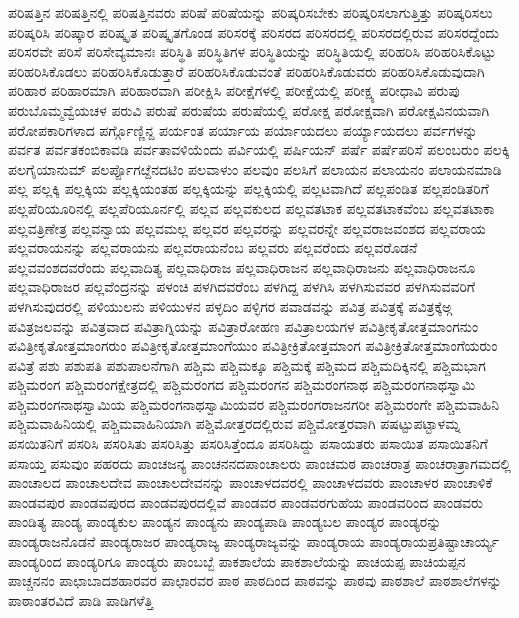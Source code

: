 {ಪರಿಷತ್ತಿನ
ಪರಿಷತ್ತಿನಲ್ಲಿ
ಪರಿಷತ್ತಿನವರು
ಪರಿಷೆ
ಪರಿಷೆಯನ್ನು
ಪರಿಷ್ಕರಿಸಬೇಕು
ಪರಿಷ್ಕರಿಸಲಾಗುತ್ತಿತ್ತು
ಪರಿಷ್ಕರಿಸಲು
ಪರಿಷ್ಕರಿಸಿ
ಪರಿಷ್ಕಾರ
ಪರಿಷ್ಕೃತ
ಪರಿಷ್ಕೃತಗೊಂಡ
ಪರಿಸರಕ್ಕೆ
ಪರಿಸರದ
ಪರಿಸರದಲ್ಲಿ
ಪರಿಸರದಲ್ಲಿರುವ
ಪರಿಸರದ್ದೆಂದು
ಪರಿಸರವೇ
ಪರಿಸೆ
ಪರಿಸೇವ್ಯಮಾನಃ
ಪರಿಸ್ಥಿತಿ
ಪರಿಸ್ಥಿತಿಗಳ
ಪರಿಸ್ಥಿತಿಯನ್ನು
ಪರಿಸ್ಥಿತಿಯಲ್ಲಿ
ಪರಿಹರಿಸಿ
ಪರಿಹರಿಸಿಕೊಟ್ಟು
ಪರಿಹರಿಸಿಕೊಡಲು
ಪರಿಹರಿಸಿಕೊಡುತ್ತಾರೆ
ಪರಿಹರಿಸಿಕೊಡುವಂತೆ
ಪರಿಹರಿಸಿಕೊಡುವರು
ಪರಿಹರಿಸಿಕೊಡುವುದಾಗಿ
ಪರಿಹಾರ
ಪರಿಹಾರಮಾಗಿ
ಪರಿಹಾರವಾಗಿ
ಪರೀಕ್ಷಿಸಿ
ಪರೀಕ್ಷೆಗಳಲ್ಲಿ
ಪರೀಕ್ಷೆಯಲ್ಲಿ
ಪರೀಕ್ಷ್ಯ
ಪರೀಧಾವಿ
ಪರುಪು
ಪರುಬೊಮ್ಮವ್ವೆಯಚಳ
ಪರುವಿ
ಪರುಷೆ
ಪರುಷೆಯ
ಪರುಷೆಯಲ್ಲಿ
ಪರೋಕ್ಷ
ಪರೋಕ್ಷವಾಗಿ
ಪರೋಕ್ಷವಿನಯವಾಗಿ
ಪರೋಪಕಾರಿಗಳಾದ
ಪರ್ಗ್ಗೊಣ್ಣಿನ್ದ
ಪರ್ಯಂತ
ಪರ್ಯಾಯ
ಪರ್ಯಾಯದಲು
ಪರ್ಯ್ಯಾಯದಲು
ಪರ್ವಗಳನ್ನು
ಪರ್ವತ
ಪರ್ವತಕಂಬಿಕಾವಡಿ
ಪರ್ವತಾವಳಿಯೆಂದು
ಪರ್ವಿಯಲ್ಲಿ
ಪರ್ಷಿಯನ್
ಪರ್ಷೆ
ಪರ್ಷೆಪರಿಸೆ
ಪಲಂಬರುಂ
ಪಲಕ್ಕಿ
ಪಲಗೈಯಾನುಮ್
ಪಲರ್ಪ್ಪೊಗೞ್ದೆನದಟಿಂ
ಪಲವಾಳುಂ
ಪಲವುಂ
ಪಲಸಿಗೆ
ಪಲಾಯನ
ಪಲಾಯನಂ
ಪಲಾಯನಮಾಡಿ
ಪಲ್ಲ
ಪಲ್ಲಕ್ಕಿ
ಪಲ್ಲಕ್ಕಿಯ
ಪಲ್ಲಕ್ಕಿಯಂತಹ
ಪಲ್ಲಕ್ಕಿಯನ್ನು
ಪಲ್ಲಕ್ಕಿಯಲ್ಲಿ
ಪಲ್ಲಟವಾಗಿದೆ
ಪಲ್ಲಪಂಡಿತ
ಪಲ್ಲಪಂಡಿತರಿಗೆ
ಪಲ್ಲಪೆರಿಯೂರಿನಲ್ಲಿ
ಪಲ್ಲಪೆರಿಯೂರ್ನಲ್ಲಿ
ಪಲ್ಲವ
ಪಲ್ಲವಕುಲದ
ಪಲ್ಲವತಟಾಕ
ಪಲ್ಲವತಟಾಕವೆಂಬ
ಪಲ್ಲವತಟಾಕಾ
ಪಲ್ಲವತ್ರಿಣೇತ್ರ
ಪಲ್ಲವನ್ವಾಯ
ಪಲ್ಲವಮಲ್ಲ
ಪಲ್ಲವರ
ಪಲ್ಲವರನ್ನು
ಪಲ್ಲವರನ್ನೇ
ಪಲ್ಲವರಾಜವಂಶದ
ಪಲ್ಲವರಾಯ
ಪಲ್ಲವರಾಯನನ್ನು
ಪಲ್ಲವರಾಯನು
ಪಲ್ಲವರಾಯನೆಂಬ
ಪಲ್ಲವರು
ಪಲ್ಲವರೆಂದು
ಪಲ್ಲವರೊಡನೆ
ಪಲ್ಲವವಂಶದವರೆಂದು
ಪಲ್ಲವಾದಿತ್ಯ
ಪಲ್ಲವಾಧಿರಾಜ
ಪಲ್ಲವಾಧಿರಾಜನ
ಪಲ್ಲವಾಧಿರಾಜನು
ಪಲ್ಲವಾಧಿರಾಜನೂ
ಪಲ್ಲವಾಧಿರಾಜರ
ಪಲ್ಲವೆಂದ್ರನನ್ನು
ಪಳಂಚಿ
ಪಳಗಿದವರೆಂಬ
ಪಳಗಿದ್ದ
ಪಳಗಿಸಿ
ಪಳಗಿಸುವವರ
ಪಳಗಿಸುವವರಿಗೆ
ಪಳಗಿಸುವುದರಲ್ಲಿ
ಪಳಿಯುಲನು
ಪಳಿಯುಳನ
ಪಳ್ಳದಿಂ
ಪಳ್ಳಿಗರ
ಪವಾಡವನ್ನು
ಪವಿತ್ರ
ಪವಿತ್ರಕ್ಕೆ
ಪವಿತ್ರಕ್ಕೆಅ್ಗ
ಪವಿತ್ರಜಲವನ್ನು
ಪವಿತ್ರವಾದ
ಪವಿತ್ರಾಗ್ನಿಯನ್ನು
ಪವಿತ್ರಾರೋಹಣ
ಪವಿತ್ರಾಲಯಗಳ
ಪವಿತ್ರೀಕೃತೋತ್ತಮಾಂಗನುಂ
ಪವಿತ್ರೀಕೃತೋತ್ತಮಾಂಗರುಂ
ಪವಿತ್ರೀಕೃತೋತ್ತಮಾಂಗೆಯುಂ
ಪವಿತ್ರೀಕ್ರಿತೋತ್ತಮಾಂಗ
ಪವಿತ್ರೀಕ್ರಿತೋತ್ತಮಾಂಗೆಯರುಂ
ಪವಿತ್ರೆ
ಪಶು
ಪಶುಪತಿ
ಪಶುಪಾಲನೆಗಾಗಿ
ಪಶ್ಚಿಮ
ಪಶ್ಚಿಮಕ್ಕೂ
ಪಶ್ಚಿಮಕ್ಕೆ
ಪಶ್ಚಿಮದ
ಪಶ್ಚಿಮದಿಕ್ಕಿನಲ್ಲಿ
ಪಶ್ಚಿಮಭಾಗ
ಪಶ್ಚಿಮರಂಗ
ಪಶ್ಚಿಮರಂಗಕ್ಷೇತ್ರದಲ್ಲಿ
ಪಶ್ಚಿಮರಂಗದ
ಪಶ್ಚಿಮರಂಗನ
ಪಶ್ಚಿಮರಂಗನಾಥ
ಪಶ್ಚಿಮರಂಗನಾಥಸ್ವಾಮಿ
ಪಶ್ಚಿಮರಂಗನಾಥಸ್ವಾಮಿಯ
ಪಶ್ಚಿಮರಂಗನಾಥಸ್ವಾಮಿಯವರ
ಪಶ್ಚಿಮರಂಗರಾಜನಗರೀ
ಪಶ್ಚಿಮರಂಗೇ
ಪಶ್ಚಿಮವಾಹಿನಿ
ಪಶ್ಚಿಮವಾಹಿನಿಯಲ್ಲಿ
ಪಶ್ಚಿಮವಾಹಿನಿಯಾಗಿ
ಪಶ್ಚಿಮೋತ್ತರದಲ್ಲಿರುವ
ಪಶ್ಚಿಮೋತ್ತರವಾಗಿ
ಪಷಟ್ಟುಪಟ್ಟಾಳಮ್ನ
ಪಸಯಿತನಿಗೆ
ಪಸರಿಸಿ
ಪಸರಿಸಿತು
ಪಸರಿಸಿತ್ತು
ಪಸರಿಸಿತ್ತೆಂದೂ
ಪಸರಿಸಿದ್ದು
ಪಸಾಯತರು
ಪಸಾಯಿತ
ಪಸಾಯಿತನಿಗೆ
ಪಸಾಯ್ತ
ಪಸುವುಂ
ಪಹರದು
ಪಾಂಚಜನ್ಯ
ಪಾಂಚನನದಪಾಂಚಾಲರು
ಪಾಂಚಮಠ
ಪಾಂಚರಾತ್ರ
ಪಾಂಚರಾತ್ರಾಗಮದಲ್ಲಿ
ಪಾಂಚಾಲದ
ಪಾಂಚಾಲದೇವ
ಪಾಂಚಾಲದೇವನನ್ನು
ಪಾಂಚಾಳದವರಲ್ಲಿ
ಪಾಂಚಾಳದವರು
ಪಾಂಚಾಳರ
ಪಾಂಚಾಳಿಕೆ
ಪಾಂಡವಪುರ
ಪಾಂಡವಪುರದ
ಪಾಂಡವಪುರದಲ್ಲಿವೆ
ಪಾಂಡವರ
ಪಾಂಡವರಗುಹೆಯ
ಪಾಂಡವರಿಂದ
ಪಾಂಡವರು
ಪಾಂಡಿತ್ಯ
ಪಾಂಡ್ಯ
ಪಾಂಡ್ಯಕುಲ
ಪಾಂಡ್ಯನ
ಪಾಂಡ್ಯನು
ಪಾಂಡ್ಯಪಾಡಿ
ಪಾಂಡ್ಯಬಲ
ಪಾಂಡ್ಯರ
ಪಾಂಡ್ಯರನ್ನು
ಪಾಂಡ್ಯರಾಜನೊಡನೆ
ಪಾಂಡ್ಯರಾಜರ
ಪಾಂಡ್ಯರಾಜ್ಯ
ಪಾಂಡ್ಯರಾಜ್ಯವನ್ನು
ಪಾಂಡ್ಯರಾಯ
ಪಾಂಡ್ಯರಾಯಪ್ರತಿಷ್ಟಾಚಾರ್ಯ್ಯ
ಪಾಂಡ್ಯರಿಂದ
ಪಾಂಡ್ಯರಿಗೂ
ಪಾಂಡ್ಯರು
ಪಾಂಬಬ್ಬೆ
ಪಾಕಶಾಲೆಯ
ಪಾಕಶಾಲೆಯನ್ನು
ಪಾಚಯಪ್ಪ
ಪಾಚಿಯಪ್ಪನ
ಪಾಚ್ಚನನಂ
ಪಾಛಾಬಾದಶಹಾರವರ
ಪಾಛಾರವರ
ಪಾಠ
ಪಾಠದಿಂದ
ಪಾಠವನ್ನು
ಪಾಠವು
ಪಾಠಶಾಲೆ
ಪಾಠಶಾಲೆಗಳನ್ನು
ಪಾಠಾಂತರವಿದೆ
ಪಾಡಿ
ಪಾಡಿಗಳೆತ್ತಿ
}
